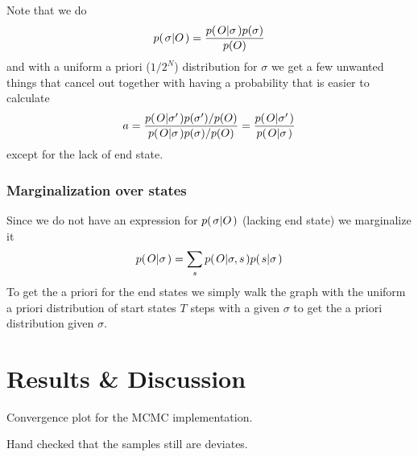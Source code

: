 \documentclass[a4paper,11pt]{kth-mag}
\begin{document}
                Note that we do
                \begin{equation}
                    p{(\left. \sigma \middle\vert O \right.)} = \frac{p{(\left. O \middle\vert \sigma \right.)}p{(\sigma)}}{p{(O)}}
                \end{equation}
                and with a uniform a priori ($1/{2^N}$) distribution for $\sigma$ we get 
                a few unwanted things that cancel out together with having a probability 
                that is easier to calculate
                \begin{equation}
                    a = \frac{
                            p{(\left. O \middle\vert \sigma' \right.)}p{(\sigma')}/p{(O)}
                        }{
                            p{(\left. O \middle\vert \sigma \right.)}p{(\sigma)}/p{(O)}
                        }
                      = \frac{
                            p{(\left. O \middle\vert \sigma' \right.)}
                        }{
                            p{(\left. O \middle\vert \sigma \right.)}
                        }
                \end{equation}
                except for the lack of end state. 

            \subsection{Marginalization over states}
                Since we do not have an expression for $p{(\left. \sigma \middle\vert O \right.)}$ (lacking end state) we marginalize it
                \begin{equation}
                    p{(\left. O \middle\vert \sigma \right.)} = \sum\limits_s p{(\left. O \middle\vert \sigma,s \right.)}p{(\left. s \middle\vert \sigma \right.)}
                \end{equation}
                To get the a priori for the end states we simply walk the graph with the 
                uniform a priori distribution of start states $T$ steps with a given 
                $\sigma$ to get the a priori distribution given $\sigma$.

    \chapter{Results \& Discussion}
        Convergence plot for the MCMC implementation.

        Hand checked that the samples still are deviates.
    
        

\end{document}
